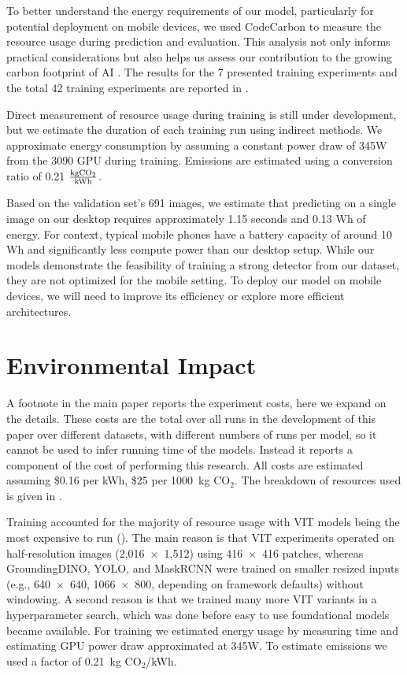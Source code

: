To better understand the energy requirements of our model, particularly for potential deployment on mobile
  devices, we used CodeCarbon \cite{lacoste2019codecarbon} to measure the resource usage during prediction and
  evaluation.
This analysis not only informs practical considerations but also helps us assess our contribution to the
  growing carbon footprint of AI \cite{kirkpatrick_carbon_2023}.
The results for the 7 presented training experiments and the total 42 training experiments are reported in
  .

Direct measurement of resource usage during training is still under development, but we estimate the
  duration of each training run using indirect methods.
We approximate energy consumption by assuming a constant power draw of 345W from the 3090 GPU during
  training.
Emissions are estimated using a conversion ratio of 0.21 $\frac{\textrm{kg}\mathrm{CO_2}{}}{\textrm{kWh}}$.
  
Based on the validation set's 691 images, we estimate that predicting on a single image on our desktop
  requires approximately 1.15 seconds and 0.13 Wh of energy.
For context, typical mobile phones have a battery capacity of around 10 Wh and significantly less compute
  power than our desktop setup.
While our models demonstrate the feasibility of training a strong detector from our dataset, they are not
  optimized for the mobile setting.
To deploy our model on mobile devices, we will need to improve its efficiency or explore more efficient
  architectures.

\section{Environmental Impact} 
\label{sec:general_environmental_impact}

A footnote in the main paper reports the experiment costs, here we expand on the details.
These costs are the total over all runs in the development of this paper over different datasets, with
  different numbers of runs per model, so it cannot be used to infer running time of the models.
Instead it reports a component of the cost of performing this research.
All costs are estimated assuming \$0.16 per kWh, \$25 per 1000~kg CO$_2$.
The breakdown of resources used is given in .

Training accounted for the majority of resource usage with VIT models being the most expensive to run
  ().
The main reason is that VIT experiments operated on half-resolution images (2,016~$\times$~1,512) using
  416~$\times$~416 patches, whereas GroundingDINO, YOLO, and MaskRCNN were trained on smaller resized inputs
  (e.g., 640~$\times$~640, 1066~$\times$~800, depending on framework defaults) without windowing.
A second reason is that we trained many more VIT variants in a hyperparameter search, which was done before
  easy to use foundational models became available.
For training we estimated energy usage by measuring time and estimating GPU power draw approximated at 345W.
To estimate emissions we used a factor of 0.21~kg CO$_2$/kWh.

